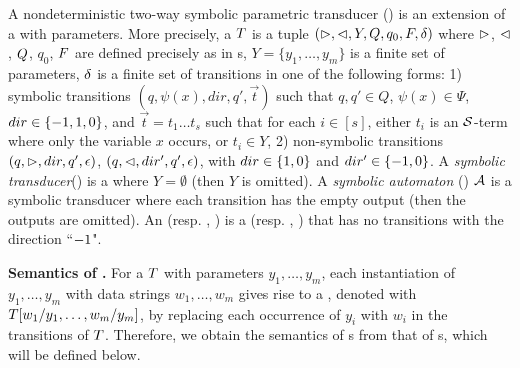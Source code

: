 \begin{definition}
A nondeterministic two-way symbolic parametric transducer (\SSPT) is an extension of a \SST{} with parameters. More precisely,  a \SSPT{} $T$ is a tuple
$(\vartriangleright, \vartriangleleft, Y, Q, q_0, F, \delta)$ where
%
$\vartriangleright$, $\vartriangleleft$, $Q$, $q_0$, $F$ are defined precisely as in \FFA{}s, 
%
$Y=\{y_1,\ldots, y_m\}$ is a finite set of parameters, 
%
$\delta$ is a finite set of transitions in one of the following forms: 
1) symbolic transitions $(q, \psi(x), dir, q', \vec{t})$ such that $q,q' \in Q$, $\psi(x) \in \Psi$, $dir \in \{-1, 1, 0\}$, 
and $\vec{t} = t_1 \ldots t_s$ such that for each $i \in [s]$, either $t_i$ is an $\mathcal{S}$-term where only the variable $x$ occurs, or $t_i \in Y$,
%
2) non-symbolic transitions $(q, \vartriangleright, dir, q', \epsilon)$, $(q, \vartriangleleft, dir', q', \epsilon)$, with $dir \in \{1, 0\}$ and $dir' \in \{-1, 0\}$. 
A \emph{symbolic transducer}(\SST) is a \SSPT{} where $Y = \emptyset$ (then $Y$ is omitted).  A \emph{symbolic automaton} (\SSA) $\mathcal{A}$ is a symbolic transducer where each transition has the  empty output (then the outputs are omitted). An \SPT{} (resp. \ST, \SA) is a  \SSPT{}(resp. \SST, \SSA) that has no transitions with the direction ``$-1$". 
\end{definition}

\smallskip
\noindent
\textbf{Semantics of \SSPT{}.}
For a \SSPT{} $T$ with parameters $y_1,\ldots, y_m$,  each instantiation of $y_1,\ldots, y_m$ with data strings 
$w_1,\ldots, w_m$ gives rise to a \SST{}, denoted with $T[w_1/y_1,\ldots, w_m/y_m]$, by replacing each occurrence of $y_i$ with $w_i$ in the transitions of $T$. Therefore, we obtain the semantics of \SSPT{}s from that of \SST{}s, which will be defined below. 

